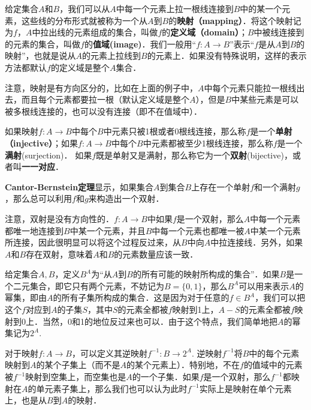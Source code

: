 
给定集合$A$和$B$，我们可以从$A$中每一个元素上拉一根线连接到$B$中的某一个元素，这些线的分布形式就被称为一个从$A$到$B$的\textbf{映射（mapping）}．将这个映射记为$f$，$A$中拉出线的元素组成的集合，叫做$f$的\textbf{定义域（domain）}；$B$中被线连接到的元素的集合，叫做$f$的\textbf{值域(image)}．我们一般用“$f:A\rightarrow B$”表示“$f$是从$A$到$B$的映射”，也就是说从$A$的元素上拉线到$B$的元素上．如果没有特殊说明，这样的表示方法都默认$f$的定义域是整个$A$集合．

注意，映射是有方向区分的，比如在上面的例子中，$A$中每个元素只能拉一根线出去，而且每个元素都要拉一根（默认定义域是整个$A$），但是$B$中某些元素是可以被多根线连接的，也可以没有连接（即不在值域中）．

如果映射$f:A\rightarrow B$中每个$B$中元素只被1根或者0根线连接，那么称$f$是一个\textbf{单射（injective）}；如果$f:A\rightarrow B$中每个$B$中元素都被至少1根线连接，那么称$f$是一个\textbf{满射}(surjection)． 如果$f$既是单射又是满射，那么称它为一个\textbf{双射}(bijective)，或者叫\textbf{一一对应}．

\textbf{Cantor-Bernstein定理}显示，如果集合$A$到集合$B$上存在一个单射$f$和一个满射$g$，那么总可以利用$f$和$g$来构造出一个双射．

注意，双射是没有方向性的．$f:A\rightarrow B$中如果$f$是一个双射，那么$A$中每一个元素都唯一地连接到$B$中某一个元素，并且$B$中每一个元素也都唯一被$A$中某一个元素所连接，因此很明显可以将这个过程反过来，从$B$中向$A$中拉连接线．另外，如果$A$和$B$存在双射，意味着$A$和$B$的元素数量应该一致．

给定集合$A, B$，定义$B^A$为“从$A$到$B$的所有可能的映射所构成的集合”．如果$B$是一个二元集合，即它只有两个元素，不妨记为$B=\{0,1\}$，那么$B^A$可以用来表示$A$的幂集，即由$A$的所有子集所构成的集合．这是因为对于任意的$f\in B^A$，我们可以把这个$f$对应到$A$的子集$S$，其中$S$的元素全都被$f$映射到1上，$A-S$的元素全都被$f$映射到0上．当然，0和1的地位反过来也可以．由于这个特点，我们简单地把$A$的幂集记为$2^A$. 

对于映射$f:A\rightarrow B$，可以定义其逆映射$f^{-1}:B\rightarrow 2^A$. 逆映射$f^{-1}$将$B$中的每个元素映射到$A$的某个子集上（而不是$A$的某个元素上）．特别地，不在$f$的值域中的元素被$f^{-1}$映射到空集上，而空集也是$A$的一个子集．如果$f$是一个双射，那么$f^{-1}$都映射在$A$的单元素子集上，那么我们也可以认为此时$f^{-1}$实际上是映射在单个元素上，也是从$B$到$A$的映射．

